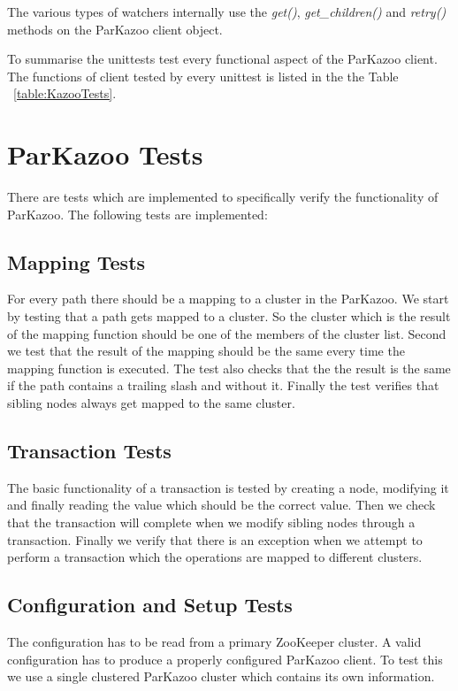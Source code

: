 	The various types of watchers internally use the \textit{get()}, \textit{get\_children()} and \textit{retry()} methods on the ParKazoo client object.

To summarise the unittests test every functional aspect of the ParKazoo client. The functions of client tested by every unittest is listed in the the Table ~\ref{table:KazooTests}.



\section{ParKazoo Tests}
There are tests which are implemented to specifically verify the functionality of ParKazoo. The following tests
are implemented:

\subsection{Mapping Tests}
For every path there should be a mapping to a cluster in the ParKazoo. We start by testing that a path gets mapped to a cluster. So the cluster which is the result of the mapping function should be one of the members of the cluster list. Second we test that the result of the mapping should be the same every time the mapping function is executed. The test also checks that the the result is the same if the path contains a trailing slash and without it. Finally the test verifies that sibling nodes always get mapped to the same cluster.

\subsection{Transaction Tests}
The basic functionality of a transaction is tested by creating a node, modifying it and finally reading the value which should be the correct value. Then we check that the transaction will complete when we modify sibling nodes through a transaction. Finally we verify that there is an exception when we attempt to perform a transaction which the operations are mapped to different clusters.

\subsection{Configuration and Setup Tests}
The configuration has to be read from a primary ZooKeeper cluster. A valid configuration has to produce a properly configured ParKazoo client. To test this we use a single clustered ParKazoo cluster which contains its own information.


